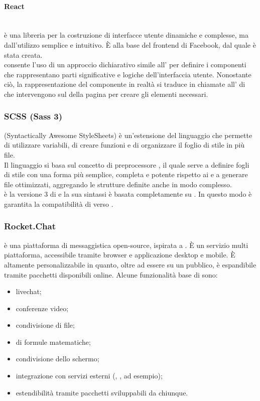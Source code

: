 \paragraph{React}\mbox{}\\
 è una libreria  per la costruzione di interfacce utente dinamiche e complesse, ma dall'utilizzo semplice e intuitivo. \`{E} alla base del frontend di Facebook, dal quale è stata creata.\\
 consente l'uso di un approccio dichiarativo simile all' per definire i componenti che rappresentano parti significative e logiche dell'interfaccia utente. Nonostante ciò, la rappresentazione del componente in realtà si traduce in chiamate all' di  che intervengono sul  della pagina per creare gli elementi necessari.

\subsubsection{SCSS (Sass 3)}
 (Syntactically Awesome StyleSheets) è un'estensione del linguaggio  che permette di utilizzare variabili, di creare funzioni e di organizzare il foglio di stile in più file.\\
Il linguaggio  si basa sul concetto di preprocessore , il quale serve a definire fogli di stile con una forma più semplice, completa e potente rispetto ai  e a generare file  ottimizzati, aggregando le strutture definite anche in modo complesso.\\
 è la versione 3 di  e la sua sintassi è basata completamente su . In questo modo è garantita la compatibilità di  verso .

\subsubsection{Rocket.Chat}
 è una piattaforma di messaggistica open-source, ispirata a . \`{E} un servizio multi piattaforma, accessibile tramite browser e applicazione desktop e mobile. \`{E} altamente personalizzabile in quanto, oltre ad essere su un  pubblico, è espandibile tramite pacchetti disponibili online. Alcune funzionalità base di  sono:
\begin{itemize}
	\item livechat;
	\item conferenze video;
	\item condivisione di file;
	\item {} di formule matematiche;
	\item condivisione dello schermo;
	\item integrazione con servizi esterni (, ,  ad esempio);
	\item estendibilità tramite pacchetti sviluppabili da chiunque.
\end{itemize}

